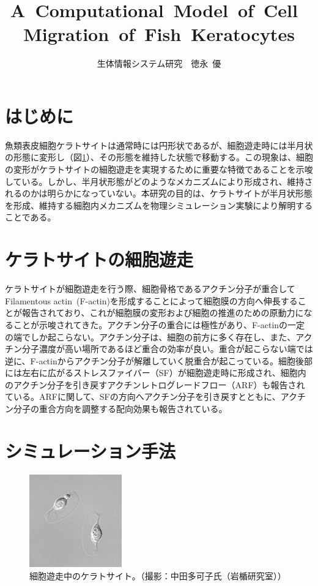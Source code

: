 \documentclass[10pt,twocolumn,a4j]{jarticle}
\title{A~Computational~Model~of~Cell~Migration~of~Fish~Keratocytes}
\author{生体情報システム研究~~徳永~優}
\date{}
\begin{document}
\maketitle
\section{はじめに}
魚類表皮細胞ケラトサイトは通常時には円形状であるが、細胞遊走時には半月状の形態に変形し（図\ref{fig:kera}）、その形態を維持した状態で移動する。この現象は、細胞の変形がケラトサイトの細胞遊走を実現するために重要な特徴であることを示唆している。しかし、半月状形態がどのようなメカニズムにより形成され、維持されるのかは明らかになっていない。本研究の目的は、ケラトサイトが半月状形態を形成、維持する細胞内メカニズムを物理シミュレーション実験により解明することである。
\section{ケラトサイトの細胞遊走}
ケラトサイトが細胞遊走を行う際、細胞骨格であるアクチン分子が重合してFilamentous actin~(F-actin)を形成することによって細胞膜の方向へ伸長することが報告されており、これが細胞膜の変形および細胞の推進のための原動力になることが示唆されてきた\cite{svitkina1997analysis}。アクチン分子の重合には極性があり、F-actinの一定の端でしか起こらない。アクチン分子は、細胞の前方に多く存在し、また、アクチン分子濃度が高い場所であるほど重合の効率が良い\cite{yumura1998spatiotemporal}。重合が起こらない端では逆に、F-actinからアクチン分子が解離していく脱重合が起こっている。細胞後部には左右に広がるストレスファイバー（SF）が細胞遊走時に形成され、細胞内のアクチン分子を引き戻すアクチンレトログレードフロー（ARF）も報告されている\cite{nakashima2015molecular}。ARFに関して、SFの方向へアクチン分子を引き戻すとともに、アクチン分子の重合方向を調整する配向効果も報告されている\cite{swaminathan2017actin}。
\section{シミュレーション手法}
\begin{figure}[tbp]
\centering
\includegraphics[width=4cm]{kera.eps}
\caption{細胞遊走中のケラトサイト。（撮影：中田多可子氏（岩楯研究室））}
\label{fig:kera}
\end{figure}
\end{document}
